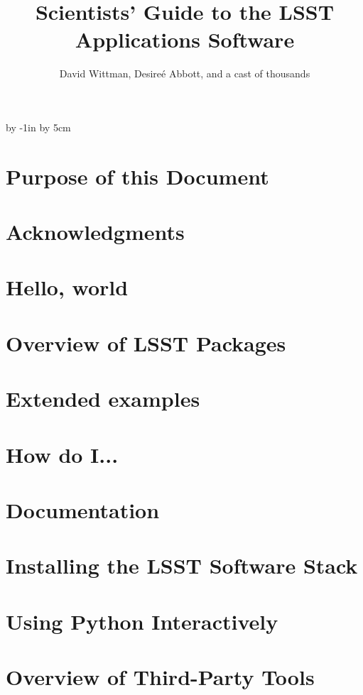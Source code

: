 \documentclass{book}
\title{Scientists' Guide to the LSST Applications Software}
\author{David Wittman, Desire\'{e} Abbott, and a cast of thousands}
\begin{document}
\advance\hoffset by -1in
\advance\hsize by 5cm

\maketitle

\chapter*{Purpose of this Document\label{chap-purpose}}


\chapter*{Acknowledgments\label{chap-acknowledgements}}



\chapter{Hello, world\label{chap-hello}}


\chapter{Overview of LSST Packages\label{chap-overview}}



\chapter{Extended examples\label{chap-examples}}


\chapter{How do I...\label{chap-howto}}


\chapter{Documentation\label{chap-doc}}


%
% 



\appendix

\chapter{Installing the LSST Software Stack\label{appendix-stackinstall}}


\chapter{Using Python Interactively\label{appendix-interactivePython}}


\chapter{Overview of Third-Party Tools\label{appendix-thirdparty}}

\end{document}
